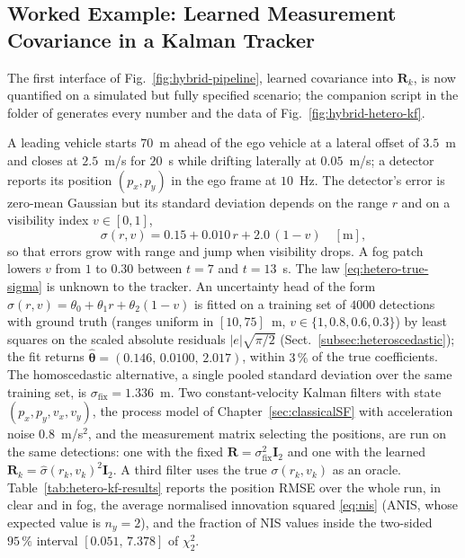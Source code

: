 \subsection{Worked Example: Learned Measurement Covariance in a Kalman Tracker}
\label{subsec:hybrid-worked-example}
The first interface of Fig.~\ref{fig:hybrid-pipeline}, learned covariance into $\mathbf{R}_k$, is now quantified on a simulated but fully specified scenario; the companion script in the folder  of  generates every number and the data of Fig.~\ref{fig:hybrid-hetero-kf}.
\begin{example}
\label{ex:hybrid-hetero-kf}
A leading vehicle starts $70$~m ahead of the ego vehicle at a lateral offset of $3.5$~m and closes at $2.5$~m/s for $20$~s while drifting laterally at $0.05$~m/s; a detector reports its position $(p_x,p_y)$ in the ego frame at $10$~Hz. The detector's error is zero-mean Gaussian but its standard deviation depends on the range $r$ and on a visibility index $v\in[0,1]$,
\begin{equation}
\sigma(r,v)=0.15+0.010\,r+2.0\,(1-v)\quad[\mathrm{m}],
\label{eq:hetero-true-sigma}
\end{equation}
so that errors grow with range and jump when visibility drops. A fog patch lowers $v$ from $1$ to $0.30$ between $t=7$ and $t=13$~s. The law \eqref{eq:hetero-true-sigma} is unknown to the tracker. An uncertainty head of the form $\widehat{\sigma}(r,v)=\theta_0+\theta_1 r+\theta_2(1-v)$ is fitted on a training set of $4000$ detections with ground truth (ranges uniform in $[10,75]$~m, $v\in\{1,0.8,0.6,0.3\}$) by least squares on the scaled absolute residuals $|e|\sqrt{\pi/2}$ (Sect.~\ref{subsec:heteroscedastic}); the fit returns $\widehat{\boldsymbol{\theta}}=(0.146,\,0.0100,\,2.017)$, within $3\,\%$ of the true coefficients. The homoscedastic alternative, a single pooled standard deviation over the same training set, is $\sigma_{\mathrm{fix}}=1.336$~m. Two constant-velocity Kalman filters with state $(p_x,p_y,v_x,v_y)$, the process model of Chapter~\ref{sec:classicalSF} with acceleration noise $0.8$~m/s$^{2}$, and the measurement matrix selecting the positions, are run on the same detections: one with the fixed $\mathbf{R}=\sigma_{\mathrm{fix}}^{2}\mathbf{I}_2$ and one with the learned $\mathbf{R}_k=\widehat{\sigma}(r_k,v_k)^{2}\mathbf{I}_2$. A third filter uses the true $\sigma(r_k,v_k)$ as an oracle. Table~\ref{tab:hetero-kf-results} reports the position RMSE over the whole run, in clear and in fog, the average normalised innovation squared \eqref{eq:nis} (ANIS, whose expected value is $n_y=2$), and the fraction of NIS values inside the two-sided $95\,\%$ interval $[0.051,\,7.378]$ of $\chi^{2}_{2}$.

\end{example}
